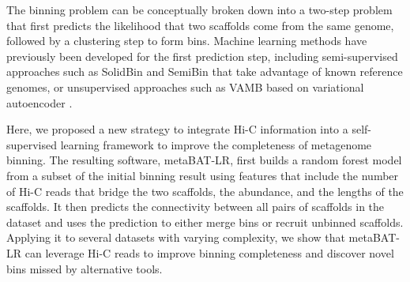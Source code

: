 \documentclass[fleqn,10pt,lineno]{wlpeerj}
\providecommand{\DIFaddbegin}{} %
\providecommand{\DIFaddend}{} %
\newcommand{\DIFaddincludegraphics}[2][]{{\color{blue}\fbox{\DIFOincludegraphics[#1]{#2}}}} %
\DeclareRobustCommand{\DIFaddbegin}{\DIFOaddbegin \let\includegraphics\DIFaddincludegraphics} %
\DeclareRobustCommand{\DIFaddend}{\DIFOaddend \let\includegraphics\DIFOincludegraphics} %
\begin{document}
The binning problem can be conceptually broken down into a two-step problem that first predicts the likelihood that two scaffolds come from the same genome, followed by a clustering step to form bins. Machine learning methods have previously been developed for the first prediction step, including semi-supervised approaches such as SolidBin \citep{wang2019solidbin} and SemiBin \citep{pan2022deep} that take advantage of known reference genomes, or unsupervised approaches such as VAMB based on variational autoencoder \citep{nissen2021improved}. 
\DIFaddbegin 

\DIFaddend Here, we proposed a new strategy to integrate Hi-C information into a self-supervised learning framework to improve the completeness of metagenome binning. The resulting software, metaBAT-LR\DIFaddbegin {}\DIFaddend , first builds a random forest model from a subset of the initial binning result using features that include the number of Hi-C reads that bridge the two scaffolds, the abundance, and the lengths of the scaffolds. It then predicts the connectivity between all pairs of scaffolds in the dataset and uses the prediction to either merge bins or recruit unbinned scaffolds. Applying it to several datasets with varying complexity, we show that metaBAT-LR can leverage Hi-C reads to improve binning completeness and discover novel bins missed by alternative tools.  
\end{document}
